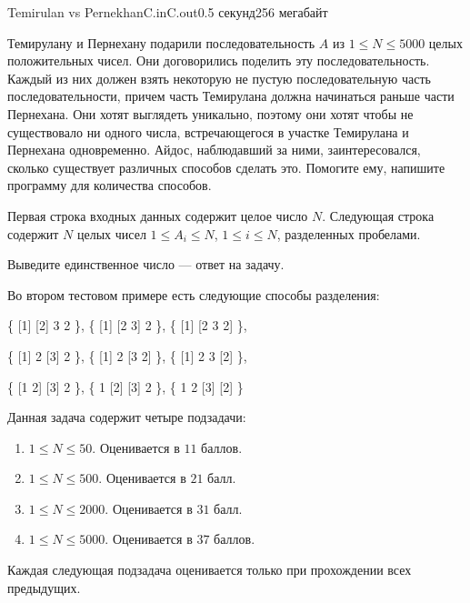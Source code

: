 \begin{problem}{Temirulan vs Pernekhan}{C.in}{C.out}{0.5 секунд}{256 мегабайт}

Темирулану и Пернехану подарили последовательность $A$ из $1 \le N \le 5000$ целых положительных чисел. Они договорились поделить эту последовательность. Каждый из них должен взять некоторую не пустую последовательную часть последовательности, причем часть Темирулана должна начинаться раньше части Пернехана. Они хотят выглядеть уникально, поэтому они хотят чтобы не существовало ни одного числа, встречающегося в участке Темирулана и Пернехана одновременно. Айдос, наблюдавший за ними, заинтересовался, сколько существует различных способов сделать это. Помогите ему, напишите программу для количества способов.

\InputFile
Первая строка входных данных содержит целое число $N$. Следующая строка содержит $N$ целых чисел $1 \le A_i \le N$, $1 \le i \le N$, разделенных пробелами. 

\OutputFile
Выведите единственное число --- ответ на задачу.

\Examples

\begin{example}
%
%
%
\end{example}


Во втором тестовом примере есть следующие способы разделения:

\{ [1] [2] 3 2 \}, \{ [1] [2 3] 2 \}, \{ [1] [2 3 2] \},

\{ [1] 2 [3] 2 \}, \{ [1] 2 [3 2] \}, \{ [1] 2 3 [2] \}, 

\{ [1 2] [3] 2 \}, \{ 1 [2] [3] 2 \}, \{ 1 2 [3] [2] \}

\Scoring
Данная задача содержит четыре подзадачи:
\begin{enumerate}
\item $1 \le N \le 50$. Оценивается в $11$ баллов.
\item $1 \le N \le 500$. Оценивается в $21$ балл.
\item $1 \le N \le 2000$. Оценивается в $31$ балл.
\item $1 \le N \le 5000$. Оценивается в $37$ баллов.
\end{enumerate}

Каждая следующая подзадача оценивается только при прохождении всех предыдущих.

\end{problem}
